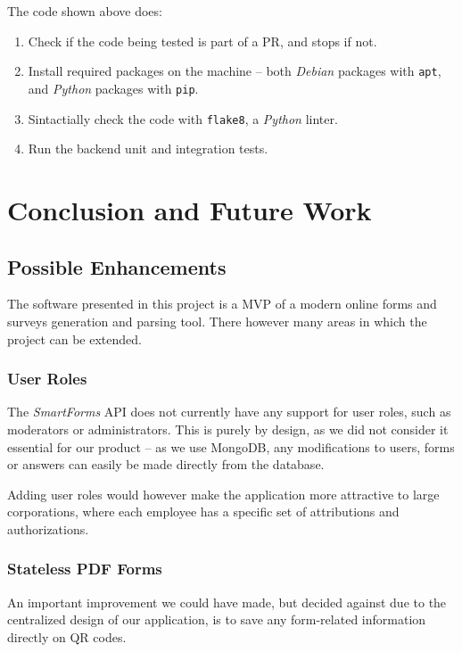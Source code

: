 \documentclass[11pt, a4paper]{report}
\def\code#1{\texttt{#1}}
\begin{document}
The code shown above does:
\begin{enumerate}
	\item Check if the code being tested is part of a PR, and stops if not. 
	\item Install required packages on the machine -- both \textit{Debian} packages with \code{apt}, and \textit{Python} packages with \code{pip}.
	\item Sintactially check the code with \code{flake8}, a \textit{Python} linter.
	\item Run the backend unit and integration tests.
\end{enumerate}

\chapter{Conclusion and Future Work}

\section{Possible Enhancements}

The software presented in this project is a MVP of a modern online forms and surveys generation and parsing tool. There however many areas in which the project can be extended.

\subsection{User Roles}

The \textit{SmartForms} API does not currently have any support for user roles, such as moderators or administrators. This is purely by design, as we did not consider it essential for our product -- as we use MongoDB, any modifications to users, forms or answers can easily be made directly from the database.

Adding user roles would however make the application more attractive to large corporations, where each employee has a specific set of attributions and authorizations.

\subsection{Stateless PDF Forms}

An important improvement we could have made, but decided against due to the centralized design of our application, is to save any form-related information directly on QR codes.
\end{document}
